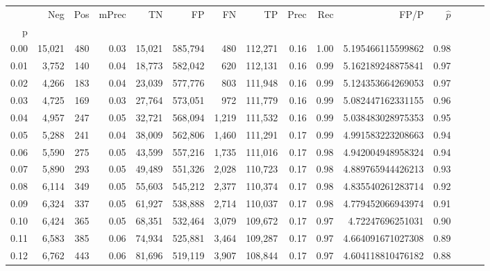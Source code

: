 \begin{tabular}{rrrrrrrrrrrrrrr}
\toprule
{} &     Neg &    Pos & mPrec &       TN &       FP &       FN &       TP &  Prec &   Rec &                  FP/P & $\hat{p}$ \\
p    &         &        &       &          &          &          &          &       &       &                       &           \\
\midrule
0.00 &  15,021 &    480 &  0.03 &   15,021 &  585,794 &      480 &  112,271 &  0.16 &  1.00 &     5.195466115599862 &      0.98 \\
0.01 &   3,752 &    140 &  0.04 &   18,773 &  582,042 &      620 &  112,131 &  0.16 &  0.99 &     5.162189248875841 &      0.97 \\
0.02 &   4,266 &    183 &  0.04 &   23,039 &  577,776 &      803 &  111,948 &  0.16 &  0.99 &     5.124353664269053 &      0.97 \\
0.03 &   4,725 &    169 &  0.03 &   27,764 &  573,051 &      972 &  111,779 &  0.16 &  0.99 &     5.082447162331155 &      0.96 \\
0.04 &   4,957 &    247 &  0.05 &   32,721 &  568,094 &    1,219 &  111,532 &  0.16 &  0.99 &     5.038483028975353 &      0.95 \\
0.05 &   5,288 &    241 &  0.04 &   38,009 &  562,806 &    1,460 &  111,291 &  0.17 &  0.99 &     4.991583223208663 &      0.94 \\
0.06 &   5,590 &    275 &  0.05 &   43,599 &  557,216 &    1,735 &  111,016 &  0.17 &  0.98 &     4.942004948958324 &      0.94 \\
0.07 &   5,890 &    293 &  0.05 &   49,489 &  551,326 &    2,028 &  110,723 &  0.17 &  0.98 &     4.889765944426213 &      0.93 \\
0.08 &   6,114 &    349 &  0.05 &   55,603 &  545,212 &    2,377 &  110,374 &  0.17 &  0.98 &     4.835540261283714 &      0.92 \\
0.09 &   6,324 &    337 &  0.05 &   61,927 &  538,888 &    2,714 &  110,037 &  0.17 &  0.98 &     4.779452066943974 &      0.91 \\
0.10 &   6,424 &    365 &  0.05 &   68,351 &  532,464 &    3,079 &  109,672 &  0.17 &  0.97 &      4.72247696251031 &      0.90 \\
0.11 &   6,583 &    385 &  0.06 &   74,934 &  525,881 &    3,464 &  109,287 &  0.17 &  0.97 &     4.664091671027308 &      0.89 \\
0.12 &   6,762 &    443 &  0.06 &   81,696 &  519,119 &    3,907 &  108,844 &  0.17 &  0.97 &     4.604118810476182 &      0.88 \\

\end{tabular}
